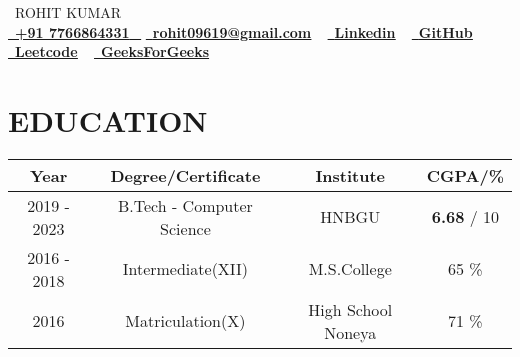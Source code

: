 \documentclass[letterpaper,11pt]{article}
\begin{document}

\begin{center}
    {\Huge \scshape\ ROHIT KUMAR } \\  \vspace{3pt}
    \small \href{tel:+91 7766864331}{ \raisebox{-0.1\height}\faPhone\ \underline{\textbf{+91 7766864331}} ~} \href{mailto:rohit09619@gmail.com}{\raisebox{-0.2\height}\faEnvelope\  \underline{\textbf{rohit09619@gmail.com}}} ~ 
    \href{https://linkedin.com/in/rohit-kr19}{\raisebox{-0.2\height}\faLinkedinSquare\ \underline{\textbf{Linkedin}}}  ~
    \href{https://github.com/rohitkr01}{\raisebox{-0.2\height}\faGithub\ \underline{\textbf{GitHub}}} ~
    \hspace{2pt}\href{https://leetcode.com/rohit_kr19}{\raisebox{-0.2\height}\faExternalLink \ \underline{\textbf{Leetcode}}} ~
    \hspace{4pt}\href{https://auth.geeksforgeeks.org/user/rohitkr01/practice}{\raisebox{-0.2\height}\faExternalLink\ \underline{\textbf{GeeksForGeeks}}} ~
    
\end{center}

\vspace{-18pt}
\section{EDUCATION}
    \vspace{-15pt}
    \setlength{\tabcolsep}{26pt}
    \begin{table}[ht]
        \centering
        \begin{tabular}{|c|c|c|c|}
        \hline
        \textbf{Year}  & \textbf{Degree/Certificate}  & \textbf{Institute} & \textbf{CGPA/\%} \\ 
        \hline
        2019 - 2023 &  B.Tech - Computer Science   &    HNBGU   &   \textbf{6.68} / 10 \\ 
        \hline
        2016 - 2018 &  Intermediate(XII)   & M.S.College & 65 \%    \\ 
        \hline
        2016 &  Matriculation(X)   &  High School Noneya   &  71 \%   \\
        \hline
        \end{tabular}
    \end{table}
  \vspace{-16pt}
  
\end{document}

